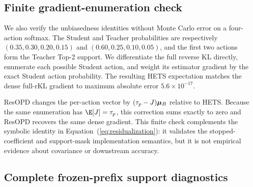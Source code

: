 
\subsection{Finite gradient-enumeration check}
\label{app:finite-check}

We also verify the unbiasedness identities without Monte Carlo error on a
four-action softmax. The Student and Teacher probabilities are respectively
$(0.35,0.30,0.20,0.15)$ and $(0.60,0.25,0.10,0.05)$, and the first two actions form the
Teacher Top-2 support. We differentiate the full reverse KL directly, enumerate
each possible Student action, and weight its estimator gradient by the exact
Student action probability. The resulting HETS expectation matches the dense
full-rKL gradient to maximum absolute error $5.6\times10^{-17}$.

ResOPD changes the per-action vector by
$(\tau_p-J)\bm{\mu}_B$ relative to HETS. Because the same enumeration has
$\E[J]=\tau_p$, this correction sums exactly to zero and ResOPD recovers the same
dense gradient. This finite check complements the symbolic identity in
Equation~(\ref{eq:residualization}): it validates the stopped-coefficient and
support-mask implementation semantics, but it is not empirical evidence about
covariance or downstream accuracy.

\subsection{Complete frozen-prefix support diagnostics}
\label{app:fixed-prefix-sweep}

